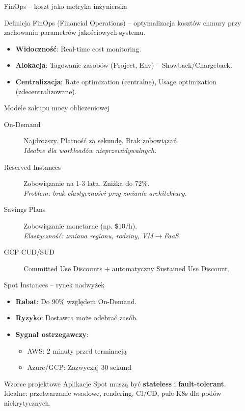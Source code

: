 \documentclass[aspectratio=169]{beamer}
\begin{document}
\begin{frame}{FinOps – koszt jako metryka inżynierska}
    \begin{block}{Definicja}
        FinOps (Financial Operations) – optymalizacja kosztów chmury przy zachowaniu parametrów jakościowych systemu.
    \end{block}
    \begin{itemize}
        \item \textbf{Widoczność}: Real-time cost monitoring.
        \item \textbf{Alokacja}: Tagowanie zasobów (Project, Env) – Showback/Chargeback.
        \item \textbf{Centralizacja}: Rate optimization (centralne), Usage optimization (zdecentralizowane).
    \end{itemize}
\end{frame}

\begin{frame}{Modele zakupu mocy obliczeniowej}
    \begin{description}
        \item[On-Demand] Najdroższy. Płatność za sekundę. Brak zobowiązań. \\
            \textit{Idealne dla workloadów nieprzewidywalnych.}
        \item[Reserved Instances] Zobowiązanie na 1-3 lata. Zniżka do 72\%. \\
            \textit{Problem: brak elastyczności przy zmianie architektury.}
        \item[Savings Plans] Zobowiązanie monetarne (np. \$10/h). \\
            \textit{Elastyczność: zmiana regionu, rodziny, VM$\rightarrow$FaaS.}
        \item[GCP CUD/SUD] Committed Use Discounts + automatyczny Sustained Use Discount.
    \end{description}
\end{frame}

\begin{frame}{Spot Instances – rynek nadwyżek}
    \begin{itemize}
        \item \textbf{Rabat}: Do 90\% względem On-Demand.
        \item \textbf{Ryzyko}: Dostawca może odebrać zasób.
        \item \textbf{Sygnał ostrzegawczy}:
        \begin{itemize}
            \item AWS: 2 minuty przed terminacją
            \item Azure/GCP: Zazwyczaj 30 sekund
        \end{itemize}
    \end{itemize}
    \begin{alertblock}{Wzorce projektowe}
        Aplikacje Spot muszą być \textbf{stateless} i \textbf{fault-tolerant}. \\
        Idealne: przetwarzanie wsadowe, rendering, CI/CD, pule K8s dla podów niekrytycznych.
    \end{alertblock}
\end{frame}
\end{document}
